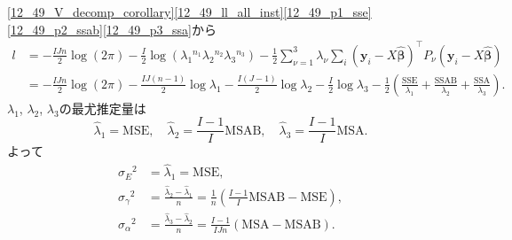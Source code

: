 \eqref{12_49_V_decomp_corollary}\eqref{12_49_ll_all_inst}\eqref{12_49_p1_sse}\eqref{12_49_p2_ssab}\eqref{12_49_p3_ssa}から
\begin{align*}
  l &= - \frac{IJn}{2} \log (2\pi)
  - \frac{I}{2} \log (\lambda_1{}^{n_1} \lambda_2{}^{n_2} \lambda_3{}^{n_3})
  - \frac{1}{2} \sum_{\nu=1}^3 \lambda_\nu \sum_i (\boldsymbol{y}_i - X \hat{\boldsymbol\beta})^\top P_\nu (\boldsymbol{y}_i - X \hat{\boldsymbol\beta}) \\
  &=  - \frac{IJn}{2} \log (2\pi)
  - \frac{IJ(n-1)}{2} \log\lambda_1 - \frac{I(J-1)}{2} \log\lambda_2 - \frac{I}{2} \log\lambda_3
  - \frac{1}{2} \left( \frac{\text{SSE}}{\lambda_1} + \frac{\text{SSAB}}{\lambda_2} + \frac{\text{SSA}}{\lambda_3} \right) .
\end{align*}
\(\lambda_1\), \(\lambda_2\), \(\lambda_3\)の最尤推定量は
\[
{\hat\lambda}_1 = \text{MSE} , \quad
{\hat\lambda}_2 = \frac{I-1}{I} \text{MSAB} , \quad
{\hat\lambda}_3 = \frac{I-1}{I} \text{MSA} .
\]
よって
\begin{align*}
  {\hat\sigma}_E{}^2 &= {\hat\lambda}_1 = \text{MSE} , \\
  {\hat\sigma}_\gamma{}^2 &= \frac{{\hat\lambda}_2 - {\hat\lambda}_1}{n} = \frac{1}{n} \left( \frac{I-1}{I} \text{MSAB} - \text{MSE} \right) , \\
  {\hat\sigma}_\alpha{}^2 &= \frac{{\hat\lambda}_3 - {\hat\lambda}_2}{n} = \frac{I-1}{IJn} (\text{MSA} - \text{MSAB}) .
\end{align*}
